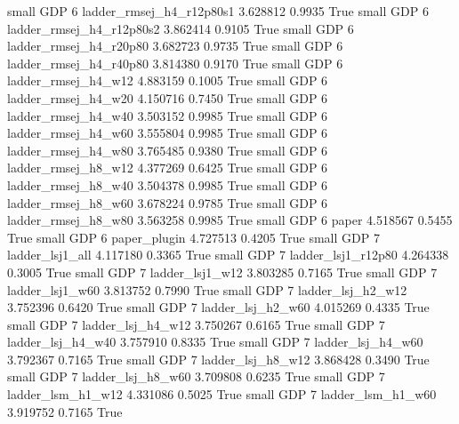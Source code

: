      small      GDP                 6 ladder_rmsej_h4_r12p80s1   3.628812      0.9935    True
     small      GDP                 6 ladder_rmsej_h4_r12p80s2   3.862414      0.9105    True
     small      GDP                 6   ladder_rmsej_h4_r20p80   3.682723      0.9735    True
     small      GDP                 6   ladder_rmsej_h4_r40p80   3.814380      0.9170    True
     small      GDP                 6      ladder_rmsej_h4_w12   4.883159      0.1005    True
     small      GDP                 6      ladder_rmsej_h4_w20   4.150716      0.7450    True
     small      GDP                 6      ladder_rmsej_h4_w40   3.503152      0.9985    True
     small      GDP                 6      ladder_rmsej_h4_w60   3.555804      0.9985    True
     small      GDP                 6      ladder_rmsej_h4_w80   3.765485      0.9380    True
     small      GDP                 6      ladder_rmsej_h8_w12   4.377269      0.6425    True
     small      GDP                 6      ladder_rmsej_h8_w40   3.504378      0.9985    True
     small      GDP                 6      ladder_rmsej_h8_w60   3.678224      0.9785    True
     small      GDP                 6      ladder_rmsej_h8_w80   3.563258      0.9985    True
     small      GDP                 6                    paper   4.518567      0.5455    True
     small      GDP                 6             paper_plugin   4.727513      0.4205    True
     small      GDP                 7          ladder_lsj1_all   4.117180      0.3365    True
     small      GDP                 7       ladder_lsj1_r12p80   4.264338      0.3005    True
     small      GDP                 7          ladder_lsj1_w12   3.803285      0.7165    True
     small      GDP                 7          ladder_lsj1_w60   3.813752      0.7990    True
     small      GDP                 7        ladder_lsj_h2_w12   3.752396      0.6420    True
     small      GDP                 7        ladder_lsj_h2_w60   4.015269      0.4335    True
     small      GDP                 7        ladder_lsj_h4_w12   3.750267      0.6165    True
     small      GDP                 7        ladder_lsj_h4_w40   3.757910      0.8335    True
     small      GDP                 7        ladder_lsj_h4_w60   3.792367      0.7165    True
     small      GDP                 7        ladder_lsj_h8_w12   3.868428      0.3490    True
     small      GDP                 7        ladder_lsj_h8_w60   3.709808      0.6235    True
     small      GDP                 7        ladder_lsm_h1_w12   4.331086      0.5025    True
     small      GDP                 7        ladder_lsm_h1_w60   3.919752      0.7165    True
